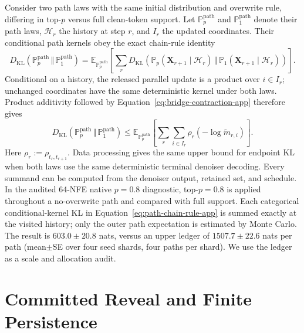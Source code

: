 \documentclass{article}
\newcommand{\KL}{D_{\mathrm{KL}}}
\newcommand{\kldiv}{\,\Vert\,}
\newcommand{\E}{\mathbb E}
\newcommand{\1}{\mathbf 1}
\theoremstyle{definition}
\begin{document}
Consider two path laws with the same initial distribution and overwrite rule,
differing in top-$p$ versus full clean-token support. Let
$\mathbb P_p^{\mathrm{path}}$ and $\mathbb P_1^{\mathrm{path}}$ denote their
path laws, $\mathcal H_r$ the history at step $r$, and $I_r$ the updated
coordinates. Their conditional path kernels obey the exact chain-rule identity
\begin{equation}
 \KL(\mathbb P_p^{\mathrm{path}}\kldiv\mathbb P_1^{\mathrm{path}})
 =
 \E_{\mathbb P_p^{\mathrm{path}}}\!\left[
 \sum_r
 \KL\!\left(
 \mathbb P_p(\bm X_{r+1}\mid\mathcal H_r)
 \kldiv
 \mathbb P_1(\bm X_{r+1}\mid\mathcal H_r)
 \right)\right].
 \label{eq:path-chain-rule-app}
\end{equation}
Conditional on a history, the released parallel update is a product over
$i\in I_r$; unchanged coordinates have the same deterministic kernel under
both laws. Product additivity followed by
Equation~\eqref{eq:bridge-contraction-app} therefore gives
\begin{equation}
 \KL(\mathbb P_p^{\mathrm{path}}\kldiv\mathbb P_1^{\mathrm{path}})
 \le
 \E_{\mathbb P_p^{\mathrm{path}}}\!\left[
 \sum_r\sum_{i\in I_r}\rho_r
 (-\log\widetilde m_{r,i})\right].
 \label{eq:path-ledger-app}
\end{equation}
Here $\rho_r:=\rho_{t_r,t_{r+1}}$. Data processing gives the same upper bound
for endpoint KL when both laws use the same deterministic terminal denoiser
decoding. Every summand can be computed from the denoiser output, retained set,
and schedule. In the audited
64-NFE native $p=0.8$ diagnostic, top-$p=0.8$ is applied throughout a
no-overwrite path and compared with full support. Each categorical
conditional-kernel KL in
Equation~\eqref{eq:path-chain-rule-app} is summed exactly at the visited
history; only the outer path expectation is estimated by Monte Carlo. The
result is $603.0\pm20.8$ nats, versus an upper ledger of
$1507.7\pm22.6$ nats per path (mean$\pm$SE over four seed shards, four paths
per shard). We use the ledger as a scale and allocation audit.
\fi

\FloatBarrier

\section{Committed Reveal and Finite Persistence}
\label{app:crs-algorithm}
\end{document}
